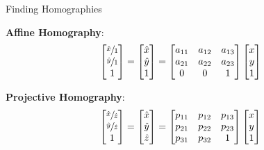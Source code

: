 \documentclass{beamer}
\begin{document}
\begin{frame}[c]{\sc Finding Homographies}

\textbf{Affine Homography}:
\begin{equation}
\label{AffineHomographySolve}
\begin{bmatrix}\sfrac{\hat{x}}{1}\\\sfrac{\hat{y}}{1}\\1\end{bmatrix}=\begin{bmatrix}\hat{x}\\\hat{y}\\1\end{bmatrix}=\begin{bmatrix}a_{11}&a_{12}&a_{13}\\a_{21}&a_{22}&a_{23}\\0&0&1\end{bmatrix}\begin{bmatrix}x\\y\\1\end{bmatrix}
\end{equation}

\vfill

\textbf{Projective Homography}:
\begin{equation}
\label{ProjectiveHomographySolve}
\begin{bmatrix}\sfrac{\hat{x}}{\hat{z}}\\\sfrac{\hat{y}}{\hat{z}}\\1\end{bmatrix}=\begin{bmatrix}\hat{x}\\\hat{y}\\\hat{z}\end{bmatrix}=\begin{bmatrix}p_{11}&p_{12}&p_{13}\\p_{21}&p_{22}&p_{23}\\p_{31}&p_{32}&1\end{bmatrix}\begin{bmatrix}x\\y\\1\end{bmatrix}
\end{equation}

\end{frame}
\end{document}
